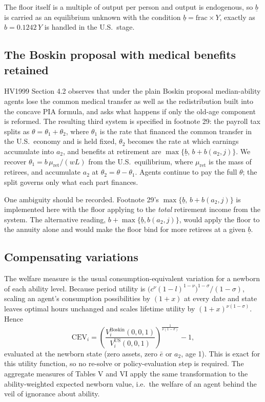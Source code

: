 \documentclass[11pt,fleqn]{article}
\begin{document}
The floor itself is a multiple of output per person and output is endogenous, so
$\underline{b}$ is carried as an equilibrium unknown with the condition
$\underline{b}=\text{frac}\times Y$, exactly as $b=0.1242\,Y$ is handled in the U.S.\ stage.

\subsection*{The Boskin proposal with medical benefits retained}\label{sec:medical}

HV1999 Section 4.2 observes that under the plain Boskin proposal median-ability agents lose
the common medical transfer as well as the redistribution built into the concave PIA formula,
and asks what happens if only the old-age component is reformed. The resulting third system is
specified in footnote 29: the payroll tax splits as $\theta=\theta_1+\theta_2$, where
$\theta_1$ is the rate that financed the common transfer in the U.S.\ economy and is held
fixed, $\theta_2$ becomes the rate at which earnings accumulate into $a_2$, and benefits at
retirement are $\max\{\underline{b},\, b + b(a_2,j)\}$. We recover
$\theta_1 = b\,\mu_{\text{ret}}/(wL)$ from the U.S.\ equilibrium, where $\mu_{\text{ret}}$ is
the mass of retirees, and accumulate $a_2$ at $\theta_2=\theta-\theta_1$. Agents continue to
pay the full $\theta$; the split governs only what each part finances.

One ambiguity should be recorded. Footnote 29's $\max\{\underline{b},\,b+b(a_2,j)\}$ is
implemented here with the floor applying to the \emph{total} retirement income from the
system. The alternative reading, $b+\max\{\underline{b},b(a_2,j)\}$, would apply the floor to
the annuity alone and would make the floor bind for more retirees at a given
$\underline{b}$.

\subsection*{Compensating variations}

The welfare measure is the usual consumption-equivalent variation for a newborn of each
ability level. Because period utility is $\big(c^{\nu}(1-l)^{1-\nu}\big)^{1-\sigma}/(1-\sigma)$,
scaling an agent's consumption possibilities by $(1+x)$ at every date and state leaves optimal
hours unchanged and scales lifetime utility by $(1+x)^{\nu(1-\sigma)}$. Hence
\begin{equation*}
 \text{CEV}_i = \left(\frac{V^{\text{Boskin}}_i(0,0,1)}{V^{\text{US}}_i(0,0,1)}\right)^{\frac{1}{\nu(1-\sigma)}} - 1,
\end{equation*}
evaluated at the newborn state (zero assets, zero $\bar{e}$ or $a_2$, age 1). This is exact for
this utility function, so no re-solve or policy-evaluation step is required. The aggregate
measures of Tables V and VI apply the same transformation to the ability-weighted expected
newborn value, i.e.\ the welfare of an agent behind the veil of ignorance about ability.
\end{document}
